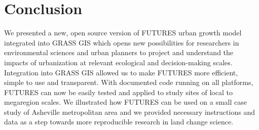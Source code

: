 \documentclass{isprs}
\begin{document}
\section{Conclusion}
We presented a new, open source version of FUTURES urban growth model
integrated into GRASS GIS which opens new possibilities
for researchers in environmental sciences and urban planners to 
project and understand the impacts of urbanization at relevant ecological and decision-making scales.
Integration into GRASS GIS allowed us to make FUTURES more efficient,
simple to use and transparent.
With documented code running on all platforms, FUTURES can now be easily tested
and applied to study sites of local to megaregion scales.
We illustrated how FUTURES can be used on a small case study of Asheville metropolitan area
and we provided necessary instructions and
data as a step towards more reproducible research in land change science.





% 
% 



% 
% 
% 
% 
\end{document}
